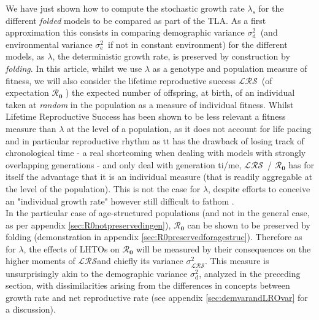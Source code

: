 \documentclass[10pt,a4paper]{article}
\newcommand{\lam}{$\lambda$}
\newcommand{\Rzero}{$\boldsymbol{\mathcal{R}_{0}}$  }
\newcommand{\LRO}{$\mathcal{LRS}$}
\newcommand{\vLRO}{$\sigma_{\mathrm{\mathcal{LRS}}}^2$}
\newcommand{\vd}{$\sigma_{\mathrm{d}}^2$}
\newcommand{\ve}{$\sigma_{\mathrm{e}}^2$}
\begin{document}
We have just shown how to compute the stochastic growth rate $\lambda_{s}$ for the different \emph{folded} models to be compared as part of the TLA.  As a first approximation this consists in comparing demographic variance \vd\ (and environmental variance \ve\ if not in constant environment) for the different models, as \lam, the deterministic growth rate, is preserved by construction by \emph{folding}.
In this article, whilst we use $\lambda$ as a genotype and population measure of fitness, we will also consider the lifetime reproductive success \LRO\ (of expectation \Rzero) the expected number of offspring, at birth, of an individual taken at  \emph{random} in the population as a measure of individual fitness. Whilst Lifetime Reproductive Success has been shown to be less relevant a fitness measure than $\lambda$ at the level of a population, as it does not account for life pacing and in particular reproductive rhythm \citep{Giske1993,Murray1992,Nur1984} as tt has the drawback of losing track of chronological time - a real shortcoming when dealing with models with strongly overlapping generations - and only deal with generation ti/me, \LRO\ / \Rzero has for itself the advantage that it is an individual measure (that is readily aggregable at the level of the population). This is not the case for \lam, despite efforts to conceive an "individual growth rate" however still difficult to fathom \citep{McGraw1997}.\\

In the particular case of age-structured populations (and not in the general case, as per appendix \ref{sec:R0notpreservedingen}), \Rzero can be shown to be preserved by folding (demonstration in appendix \ref{sec:R0preservedforagestruc}). Therefore as for \lam,  the effects of LHTOs on \Rzero will be measured by their consequences on the higher moments of \LRO and chiefly its variance \vLRO. This measure is unsurprisingly akin to the demographic variance \vd, analyzed in the preceding section,  with dissimilarities arising from the differences in concepts between growth rate and net reproductive rate (see appendix \ref{sec:demvarandLROvar} for a discussion).\\
\end{document}
